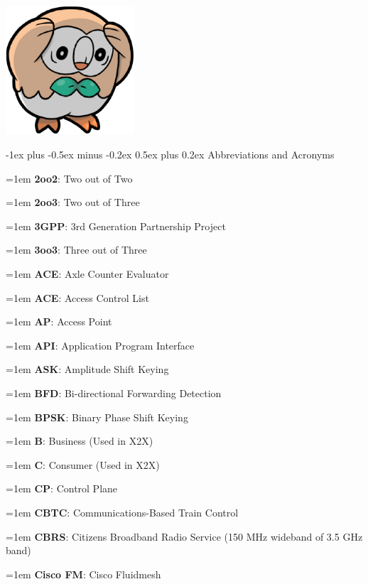 \documentclass[letterpaper,8pt]{extarticle}
\makeatletter
\newcommand{\definition}[2]{
  \hangindent=1em
  \textbf{#1}: #2%
}
\renewcommand{\section}{\@startsection{section}{1}{0mm}%
  {-1ex plus -0.5ex minus -0.2ex}%
  {0.5ex plus 0.2ex}%
{\color{h1} \normalfont\small\bfseries}}
\makeatother
\begin{document}
\begin{multicols*}{5}

  \begin{center}
    \includegraphics[width=4.8cm]{ROWLET.png}
  \end{center}

  \section{Abbreviations and Acronyms}

  \begin{multicols*}{2}
    \definition{2oo2}{Two out of Two}

    \definition{2oo3}{Two out of Three}

    \definition{3GPP}{3rd Generation Partnership Project}

    \definition{3oo3}{Three out of Three}

    \definition{ACE}{Axle Counter Evaluator}

    \definition{ACE}{Access Control List}

    \definition{AP}{Access Point}

    \definition{API}{Application Program Interface}

    \definition{ASK}{Amplitude Shift Keying}

    \definition{BFD}{Bi-directional Forwarding Detection}

    \definition{BPSK}{Binary Phase Shift Keying}

    \definition{B}{Business (Used in X2X)}

    \definition{C}{Consumer (Used in X2X)}

    \definition{CP}{Control Plane}

    \definition{CBTC}{Communications-Based Train Control}

    \definition{CBRS}{Citizens Broadband Radio Service (150 MHz wideband of 3.5 GHz band)}

    \definition{Cisco FM}{Cisco Fluidmesh}


\end{multicols*}
\end{multicols*}
\end{document}
